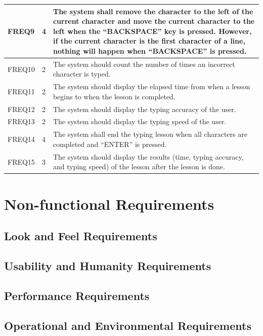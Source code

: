 \documentclass[12pt, titlepage]{article}
\begin{document}
\begin{longtable}{ |m{2cm}|m{1.8cm}|m{9.4cm}| }
    \hline
    FREQ9 & 4 & The system shall remove the character to the left of the current character and move the current character to the left when the “BACKSPACE” key is pressed. However, if the current character is the first character of a line, nothing will happen when “BACKSPACE” is pressed. \\ 
    \hline
    FREQ10 & 2 & The system should count the number of times an incorrect character is typed. \\ 
    \hline
    FREQ11 & 2 & The system should display the elapsed time from when a lesson begins to when the lesson is completed. \\ 
    \hline
    FREQ12 & 2 & The system should display the typing accuracy of the user. \\ 
    \hline
    FREQ13 & 2 & The system should display the typing speed of the user. \\ 
    \hline
    FREQ14 & 4 & The system shall end the typing lesson when all characters are completed and “ENTER” is pressed. \\ 
    \hline
    FREQ15 & 3 & The system should display the results (time, typing accuracy, and typing speed) of the lesson after the lesson is done. \\ 
    \hline

\end{longtable}


\section{Non-functional Requirements}

\subsection{Look and Feel Requirements}

\subsection{Usability and Humanity Requirements}

\subsection{Performance Requirements}

\subsection{Operational and Environmental Requirements}
\end{document}
